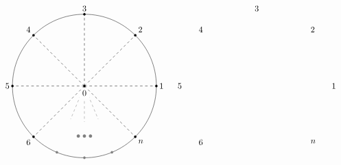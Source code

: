 \documentclass[oneside]{amsart}
\theoremstyle{plain}
\begin{document}
\begin{figure}
\begin{align*}
\begin{tikzpicture}[baseline={([yshift=-1.3ex]0,0)}]
    \pgfmathsetmacro{\rad}{3}
    \coordinate (vm)  at (0,0);
    \coordinate[label=right:$1$] (v1)  at ([shift=(0:\rad)]vm);
    \coordinate[label=above right:$2$] (v2)  at ([shift=(45:\rad)]vm);
    \coordinate[label=above:$3$] (v3)  at ([shift=(90:\rad)]vm);
    \coordinate[label=above left:$4$] (v4)  at ([shift=(135:\rad)]vm);
    \coordinate[label=left:$5$] (v5)  at ([shift=(180:\rad)]vm);
    \coordinate[label=below left:$6$] (v6)  at ([shift=(225:\rad)]vm);
    \coordinate (v7)  at ([shift=(270:\rad)]vm);
    \coordinate[label=below right:$n$] (v8)  at ([shift=(315:\rad)]vm);
    \node[black!50] (vdots) at ([shift=(270:{.7*\rad})]vm) {$\bullet \bullet \bullet$};
%
    \draw (vm) circle (\rad);
    \draw[dashed,black!50] (vm) -- ([shift=(247.5:{.5*\rad})]vm);
    \draw[dashed,black!50] (vm) -- ([shift=(270:{.5*\rad})]vm);
    \draw[dashed,black!50] (vm) -- ([shift=(292.5:{.5*\rad})]vm);
%
    \node[fill=white] (lvm) at ([shift=(270:.3)]vm) {$0$};
%
    \filldraw (vm) circle (1.3pt);
    \filldraw (v1) circle (1.3pt);
    \filldraw (v2) circle (1.3pt);
    \filldraw (v3) circle (1.3pt);
    \filldraw (v4) circle (1.3pt);
    \filldraw (v5) circle (1.3pt);
    \filldraw (v6) circle (1.3pt);
    \filldraw (v8) circle (1.3pt);
    \filldraw[black!50] ([shift=(247.5:{\rad})]vm) circle (1.3pt);
    \filldraw[black!50] ([shift=(270:{\rad})]vm) circle (1.3pt);
    \filldraw[black!50] ([shift=(292.5:{\rad})]vm) circle (1.3pt);
%
    \draw[dashed] (vm) -- (v1);
    \draw[dashed] (vm) -- (v2);
    \draw[dashed] (vm) -- (v3);
    \draw[dashed] (vm) -- (v4);
    \draw[dashed] (vm) -- (v5);
    \draw[dashed] (vm) -- (v6);
    \draw[dashed] (vm) -- (v8);
\end{tikzpicture}
&&&
\begin{tikzpicture}[baseline={([yshift=-1.3ex]0,0)}]
    \pgfmathsetmacro{\rad}{3}
    \coordinate (vm)  at (0,0);
    \coordinate[label=right:$1$] (v1)  at ([shift=(0:\rad)]vm);
    \coordinate[label=above right:$2$] (v2)  at ([shift=(45:\rad)]vm);
    \coordinate[label=above:$3$] (v3)  at ([shift=(90:\rad)]vm);
    \coordinate[label=above left:$4$] (v4)  at ([shift=(135:\rad)]vm);
    \coordinate[label=left:$5$] (v5)  at ([shift=(180:\rad)]vm);
    \coordinate[label=below left:$6$] (v6)  at ([shift=(225:\rad)]vm);
    \coordinate (v7)  at ([shift=(270:\rad)]vm);
    \coordinate[label=below right:$n$] (v8)  at ([shift=(315:\rad)]vm);

\end{tikzpicture}
\end{align*}
\end{figure}
\end{document}
